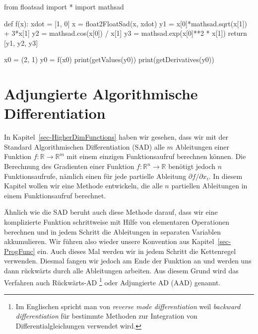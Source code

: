 \documentclass[
  a4paper,
  DIV=11]{scrreprt}
\newenvironment{Shaded}{\begin{snugshade}}{\end{snugshade}}
\newcommand{\BuiltInTok}[1]{\textcolor[rgb]{0.00,0.23,0.31}{#1}}
\newcommand{\ControlFlowTok}[1]{\textcolor[rgb]{0.00,0.23,0.31}{#1}}
\newcommand{\DecValTok}[1]{\textcolor[rgb]{0.68,0.00,0.00}{#1}}
\newcommand{\ImportTok}[1]{\textcolor[rgb]{0.00,0.46,0.62}{#1}}
\newcommand{\KeywordTok}[1]{\textcolor[rgb]{0.00,0.23,0.31}{#1}}
\newcommand{\NormalTok}[1]{\textcolor[rgb]{0.00,0.23,0.31}{#1}}
\newcommand{\OperatorTok}[1]{\textcolor[rgb]{0.37,0.37,0.37}{#1}}
\theoremstyle{definition}
\theoremstyle{definition}
\theoremstyle{remark}
\begin{document}
\begin{Shaded}
\begin{Highlighting}[]
\ImportTok{from}\NormalTok{ floatsad }\ImportTok{import} \OperatorTok{*}
\ImportTok{import}\NormalTok{ mathsad}

\KeywordTok{def}\NormalTok{ f(x):}
\NormalTok{    xdot }\OperatorTok{=}\NormalTok{ [}\DecValTok{1}\NormalTok{, }\DecValTok{0}\NormalTok{]}
\NormalTok{    x }\OperatorTok{=}\NormalTok{ float2FloatSad(x, xdot)}
\NormalTok{    y1 }\OperatorTok{=}\NormalTok{ x[}\DecValTok{0}\NormalTok{]}\OperatorTok{*}\NormalTok{mathsad.sqrt(x[}\DecValTok{1}\NormalTok{]) }\OperatorTok{+} \DecValTok{3}\OperatorTok{*}\NormalTok{x[}\DecValTok{1}\NormalTok{]}
\NormalTok{    y2 }\OperatorTok{=}\NormalTok{ mathsad.cos(x[}\DecValTok{0}\NormalTok{]) }\OperatorTok{/}\NormalTok{ x[}\DecValTok{1}\NormalTok{]}
\NormalTok{    y3 }\OperatorTok{=}\NormalTok{ mathsad.exp(x[}\DecValTok{0}\NormalTok{]}\OperatorTok{**}\DecValTok{2} \OperatorTok{*}\NormalTok{ x[}\DecValTok{1}\NormalTok{])}
    \ControlFlowTok{return}\NormalTok{ [y1, y2, y3]    }

\NormalTok{x0 }\OperatorTok{=}\NormalTok{ (}\DecValTok{2}\NormalTok{, }\DecValTok{1}\NormalTok{)}
\NormalTok{y0 }\OperatorTok{=}\NormalTok{ f(x0)}
\BuiltInTok{print}\NormalTok{(getValues(y0))}
\BuiltInTok{print}\NormalTok{(getDerivatives(y0))}
\end{Highlighting}
\end{Shaded}


\hypertarget{sec-AAD}{%
\chapter{Adjungierte Algorithmische Differentiation}\label{sec-AAD}}

In Kapitel~\ref{sec-HigherDimFunctions} haben wir gesehen, dass wir mit
der Standard Algorithmischen Differentiation (SAD) alle \(m\)
Ableitungen einer Funktion \(f : \mathbb{R} \rightarrow \mathbb{R}^m\)
mit einem einzigen Funktionsaufruf berechnen können. Die Berechnung des
Gradienten einer Funktion \(f : \mathbb{R}^n \rightarrow \mathbb{R}\)
benötigt jedoch \(n\) Funktionsaufrufe, nämlich einen für jede partielle
Ableitung \(\partial f / \partial x_i\). In diesem Kapitel wollen wir
eine Methode entwickeln, die alle \(n\) partiellen Ableitungen in einem
Funktionsaufruf berechnet.

Ähnlich wie die SAD beruht auch diese Methode darauf, dass wir eine
komplizierte Funktion schrittweise mit Hilfe von elementaren Operationen
berechnen und in jedem Schritt die Ableitungen in separaten Variablen
akkumulieren. Wir führen also wieder unsere Konvention aus
Kapitel~\ref{sec-ProgFunc} ein. Auch dieses Mal werden wir in jedem
Schritt die Kettenregel verwenden. Diesmal fangen wir jedoch am Ende der
Funktion an und werden uns dann rückwärts durch alle Ableitungen
arbeiten. Aus diesem Grund wird das Verfahren auch Rückwärts-AD
\footnote{Im Englischen spricht man von \emph{reverse mode
  differentiation} weil \emph{backward differentiation} für bestimmte
  Methoden zur Integration von Differentialgleichungen verwendet wird.}
oder Adjungierte AD (AAD) genannt.
\end{document}
